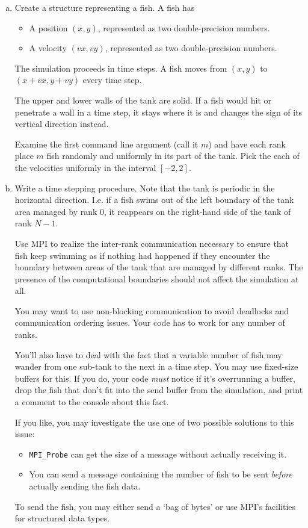 \documentclass[11pt]{article}
\begin{document}
\begin{enumerate}[a)]
  \item Create a structure representing a fish. A fish has
    \begin{itemize}
      \item A position $(x,y)$, represented as two double-precision
        numbers.
      \item A velocity $(vx,vy)$, represented as two double-precision
        numbers.
    \end{itemize}
    The simulation proceeds in time steps. A fish moves from $(x,y)$
    to $(x+vx, y+vy)$ every time step.

    The upper and lower walls of the tank are solid. If a fish would
    hit or penetrate a wall in a time step, it stays where it is and
    changes the sign of its vertical direction instead.

    Examine the first command line argument (call it $m$) and have
    each rank place $m$ fish randomly and uniformly in its part of the
    tank. Pick the each of the velocities uniformly in the interval
    $[-2,2]$.

  \item Write a time stepping procedure. Note that the tank is
    periodic in the horizontal direction. I.e. if a fish swims out of
    the left boundary of the tank area managed by rank $0$, it
    reappears on the right-hand side of the tank of rank $N-1$.

    Use MPI to realize the inter-rank communication necessary to
    ensure that fish keep swimming as if nothing had happened if they
    encounter the boundary between areas of the tank that are managed
    by different ranks. The presence of the computational boundaries
    should not affect the simulation at all.

    You may want to use non-blocking communication to avoid deadlocks
    and communication ordering issues. Your code has to work for any
    number of ranks.

    You'll also have to deal with the fact that a variable number of
    fish may wander from one sub-tank to the next in a time step.
    You may use fixed-size buffers for this. If you do, your code
    \emph{must} notice if it's overrunning a buffer, drop the fish
    that don't fit into the send buffer from the simulation, and print
    a comment to the console about this fact.

    If you like, you may investigate the use one of two possible
    solutions to this issue:
    \begin{itemize}
      \item \texttt{MPI\_Probe} can get the size of a message without
        actually receiving it.
      \item You can send a message containing the number of fish to be
        sent \emph{before} actually sending the fish data.
    \end{itemize}
    To send the fish, you may either send a `bag of bytes' or use
    MPI's facilities for structured data types.


\end{enumerate}
\end{document}
